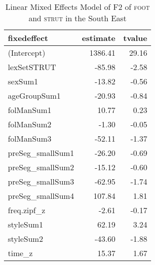 \begin{table}[ht]
\centering
\begin{tabular}{lrr}
  \hline
fixedeffect & estimate & tvalue \\ 
  \hline
(Intercept) & 1386.41 & 29.16 \\ 
  lexSetSTRUT & -85.98 & -2.58 \\ 
  sexSum1 & -13.82 & -0.56 \\ 
  ageGroupSum1 & -20.93 & -0.84 \\ 
  folManSum1 & 10.77 & 0.23 \\ 
  folManSum2 & -1.30 & -0.05 \\ 
  folManSum3 & -52.11 & -1.37 \\ 
  preSeg\_smallSum1 & -26.20 & -0.69 \\ 
  preSeg\_smallSum2 & -15.12 & -0.60 \\ 
  preSeg\_smallSum3 & -62.95 & -1.74 \\ 
  preSeg\_smallSum4 & 107.84 & 1.81 \\ 
  freq.zipf\_z & -2.61 & -0.17 \\ 
  styleSum1 & 62.19 & 3.24 \\ 
  styleSum2 & -43.60 & -1.88 \\ 
  time\_z & 15.37 & 1.67 \\ 
   \hline
\end{tabular}
\caption{Linear Mixed Effects Model of F2 of \textsc{foot} and \textsc{strut} in the South East \label{tbl:FSF2SE}} 
\end{table}
